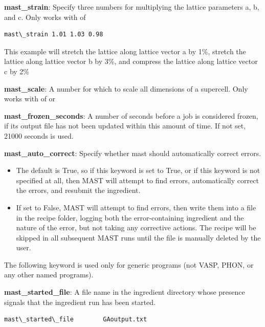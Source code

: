\documentclass[letterpaper,10pt,english]{sphinxmanual}
\begin{document}
\textbf{mast\_strain}: Specify three numbers for multiplying the lattice parameters a, b, and c. Only works with  of 

\begin{Verbatim}[commandchars=\\\{\}]
mast\_strain 1.01 1.03 0.98
\end{Verbatim}

This example will stretch the lattice along lattice vector a by 1\%, stretch the lattice along lattice vector b by 3\%, and compress the lattice along lattice vector c by 2\%

\textbf{mast\_scale}: A number for which to scale all dimensions of a supercell. Only works with  of  or 

\textbf{mast\_frozen\_seconds}: A number of seconds before a job is considered frozen, if its output file has not been updated within this amount of time. If not set, 21000 seconds is used.

\textbf{mast\_auto\_correct}: Specify whether mast should automatically correct errors.
\begin{itemize}
\item {} 
The default is True, so if this keyword is set to True, or if this keyword is not specified at all, then MAST will attempt to find errors, automatically correct the errors, and resubmit the ingredient.

\item {} 
If set to False, MAST will attempt to find errors, then write them into a  file in the recipe folder, logging both the error-containing ingredient and the nature of the error, but not taking any corrective actions. The recipe will be skipped in all subsequent MAST runs until the  file is manually deleted by the user.

\end{itemize}

The following keyword is used only for generic programs (not VASP, PHON, or any other named programs).

\textbf{mast\_started\_file}: A file name in the ingredient directory whose presence signals that the ingredient run has been started.

\begin{Verbatim}[commandchars=\\\{\}]
mast\_started\_file        GAoutput.txt
\end{Verbatim}
\end{document}

